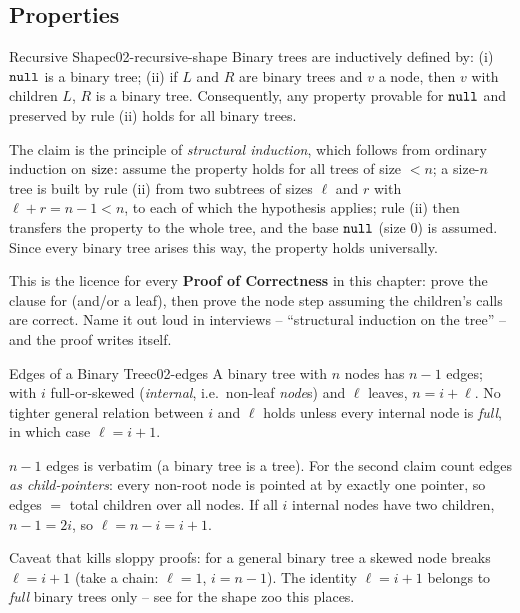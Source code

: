 \subsection{Properties}

\begin{theorem}{Recursive Shape}{c02-recursive-shape}
Binary trees are inductively defined by: (i) $\texttt{null}$ is a binary tree; (ii) if
$L$ and $R$ are binary trees and $v$ a node, then $v$ with children $L$, $R$ is a
binary tree. Consequently, any property provable for $\texttt{null}$ and preserved by
rule (ii) holds for all binary trees.
\end{theorem}
\begin{proofbox}
The claim is the principle of \emph{structural induction}, which follows from
ordinary induction on $\operatorname{size}$: assume the property holds for all trees of size
$< n$; a size-$n$ tree is built by rule (ii) from two subtrees of sizes $\ell$ and
$r$ with $\ell + r = n-1 < n$, to each of which the hypothesis applies; rule (ii)
then transfers the property to the whole tree, and the base $\texttt{null}$ (size $0$) is
assumed. Since every binary tree arises this way, the property holds universally.
\end{proofbox}
\begin{insightbox}
This is the licence for every \textbf{Proof of Correctness} in this chapter: prove
the clause for \nil{} (and/or a leaf), then prove the node step assuming the
children's calls are correct. Name it out loud in interviews -- ``structural
induction on the tree'' -- and the proof writes itself.
\end{insightbox}

\begin{theorem}{Edges of a Binary Tree}{c02-edges}
A binary tree with $n$ nodes has $n-1$ edges; with $i$ full-or-skewed
(\emph{internal}, i.e.\ non-leaf \emph{node}s) and $\ell$ leaves, $n = i + \ell$.
No tighter general relation between $i$ and $\ell$ holds unless every internal
node is \emph{full}, in which case $\ell = i + 1$.
\end{theorem}
\begin{proofbox}
$n-1$ edges is  verbatim (a binary tree is a tree). For
the second claim count edges \emph{as child-pointers}: every non-root node is
pointed at by exactly one pointer, so edges $=$ total children over all nodes.
If all $i$ internal nodes have two children, $n - 1 = 2i$, so
$\ell = n - i = i + 1$.
\end{proofbox}
\begin{insightbox}
Caveat that kills sloppy proofs: for a general binary tree a skewed node breaks
$\ell = i+1$ (take a chain: $\ell = 1$, $i = n-1$). The identity $\ell=i+1$
belongs to \emph{full} binary trees only -- see  for the
shape zoo this places.
\end{insightbox}

